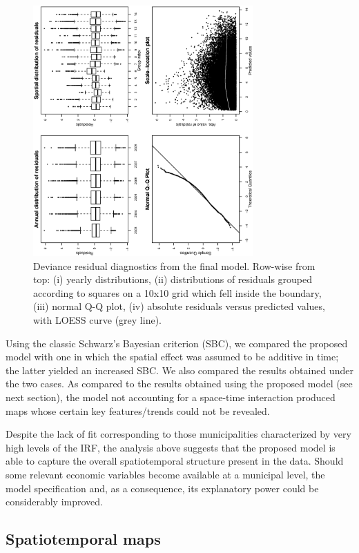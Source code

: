 \documentclass[12pt]{article}
\theoremstyle{definition}
\theoremstyle{plain}
\begin{document}
\begin{figure}[tbp]
	\centering
		\includegraphics[width=0.75\textwidth, angle=270]{Resid.eps}
	\caption{Deviance residual diagnostics from the final model. Row-wise from top: (i) yearly distributions, (ii) distributions of residuals grouped according to squares on a 10x10 grid which fell inside the boundary, (iii) normal Q-Q plot, (iv) absolute residuals versus predicted values, with LOESS curve (grey line).}
	\label{Resid}
\end{figure}

Using the classic Schwarz's Bayesian criterion (SBC), we compared the proposed model with one in which the spatial effect was assumed to be additive in time; the latter yielded an increased SBC. We also compared the results obtained under the two cases. As compared to the results obtained using the proposed model (see next section), the model not accounting for a space-time interaction produced maps whose certain key features/trends could not be revealed. 

Despite the lack of fit corresponding to those municipalities characterized by very high levels of the IRF, the analysis above suggests that the proposed model is able to capture the overall spatiotemporal structure present in the data. Should some relevant economic variables become available at a municipal level, the model specification and, as a consequence, its explanatory power could be considerably improved. 

\subsection{Spatiotemporal maps \label{STT}}
\end{document}
